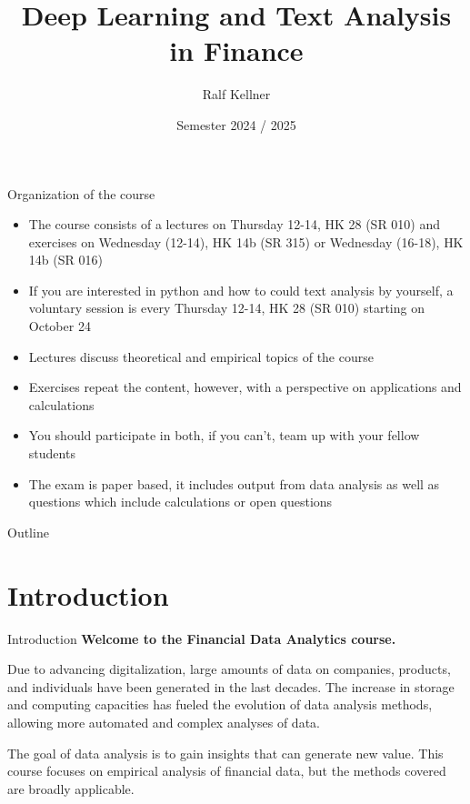 \documentclass{beamer}
\title{Deep Learning and Text Analysis in Finance}
\author{Ralf Kellner}
\date{Semester 2024 / 2025}
\begin{document}
	
	\begin{frame}
		\titlepage
	\end{frame}
	
	\begin{frame}{Organization of the course}
		\begin{itemize}
			\item The course consists of a lectures on Thursday 12-14, HK 28 (SR 010) and exercises on Wednesday (12-14), HK 14b (SR 315) or Wednesday (16-18), HK 14b (SR 016)
			\item If you are interested in python and how to could text analysis by yourself, a voluntary session is every Thursday 12-14, HK 28 (SR 010) starting on October 24
			\item Lectures discuss theoretical and empirical topics of the course
			\item Exercises repeat the content, however, with a perspective on applications and calculations
			\item You should participate in both, if you can't, team up with your fellow students
			\item The exam is paper based, it includes output from data analysis as well as questions which include calculations or open questions
		\end{itemize}
	\end{frame}
	
	\begin{frame}{Outline}
		\tableofcontents
	\end{frame}
	
	\section{Introduction}
	\begin{frame}{Introduction}
		\textbf{Welcome to the Financial Data Analytics course.}
		\vspace{0.5cm}
		
		Due to advancing digitalization, large amounts of data on companies, products, and individuals have been generated in the last decades. The increase in storage and computing capacities has fueled the evolution of data analysis methods, allowing more automated and complex analyses of data. \\
		\vspace{0.5cm}
		
		The goal of data analysis is to gain insights that can generate new value. This course focuses on empirical analysis of financial data, but the methods covered are broadly applicable.
	\end{frame}
	
\end{document}
